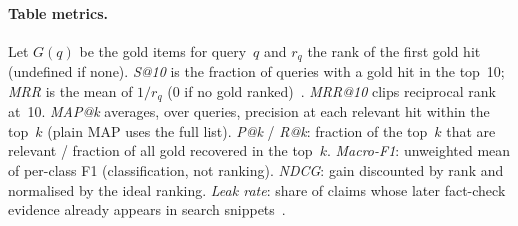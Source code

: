 \documentclass[11pt]{article}
\begin{document}
\paragraph{Table metrics.}
Let $G(q)$ be the gold items for query~$q$ and $r_q$ the rank of the first gold hit (undefined if none).
\emph{S@10} is the fraction of queries with a gold hit in the top~10; \emph{MRR} is the mean of $1/r_q$ ($0$ if no gold ranked)~\cite{pikuliak2023multilingual,peng2025semeval}.
\emph{MRR@10} clips reciprocal rank at~10.
\emph{MAP@k} averages, over queries, precision at each relevant hit within the top~$k$ (plain MAP uses the full list).
\emph{P@k} / \emph{R@k}: fraction of the top~$k$ that are relevant / fraction of all gold recovered in the top~$k$.
\emph{Macro-F1}: unweighted mean of per-class F1 (classification, not ranking).
\emph{NDCG}: gain discounted by rank and normalised by the ideal ranking.
\emph{Leak rate}: share of claims whose later fact-check evidence already appears in search snippets~\cite{glockner2022missing}.
\end{document}
